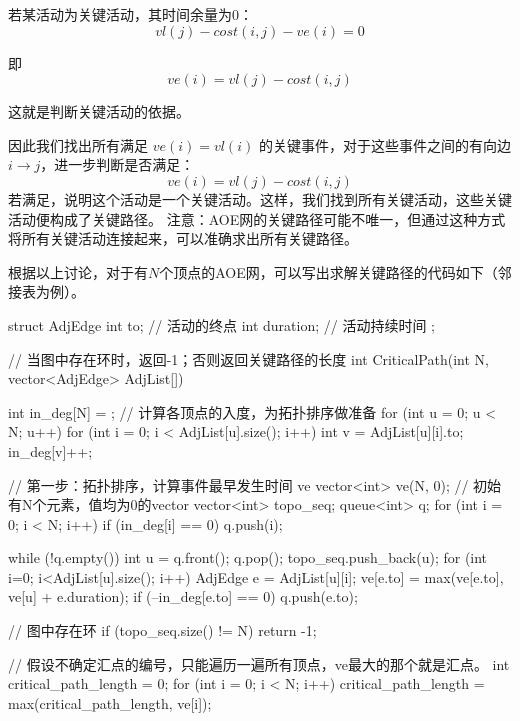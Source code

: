 若某活动为关键活动，其时间余量为0：
\[
vl(j)-cost(i,j)-ve(i)=0
\]

即
\[
    ve(i)=vl(j)-cost(i,j)
\]

这就是判断关键活动的依据。



因此我们找出所有满足 \(ve(i)=vl(i)\) 的关键事件，对于这些事件之间的有向边 \(i\rightarrow j\)，进一步判断是否满足：
\[
ve(i)=vl(j)-cost(i,j)
\]
若满足，说明这个活动是一个关键活动。这样，我们找到所有关键活动，这些关键活动便构成了关键路径。
注意：AOE网的关键路径可能不唯一，但通过这种方式将所有关键活动连接起来，可以准确求出所有关键路径。

根据以上讨论，对于有$N$个顶点的AOE网，可以写出求解关键路径的代码如下（邻接表为例）。
\begin{cppcodeNum}[codetitle={拓扑排序求解关键路径}, label={code:拓扑排序求解关键路径}]
    struct AdjEdge {
        int to;         // 活动的终点
        int duration;   // 活动持续时间
    };

    // 当图中存在环时，返回-1；否则返回关键路径的长度
    int CriticalPath(int N, vector<AdjEdge> AdjList[]) {
        int in_deg[N] = {};
        // 计算各顶点的入度，为拓扑排序做准备
        for (int u = 0; u < N; u++) {
            for (int i = 0; i < AdjList[u].size(); i++) {
                int v = AdjList[u][i].to;
                in_deg[v]++;
            }
        }

        // 第一步：拓扑排序，计算事件最早发生时间 ve
        vector<int> ve(N, 0);   // 初始有N个元素，值均为0的vector
        vector<int> topo_seq;
        queue<int> q;
        for (int i = 0; i < N; i++) {
            if (in_deg[i] == 0) {
                q.push(i);
            }
        }

        while (!q.empty()) {
            int u = q.front();
            q.pop();
            topo_seq.push_back(u);
            for (int i=0; i<AdjList[u].size(); i++) {
                AdjEdge e = AdjList[u][i];
                ve[e.to] = max(ve[e.to], ve[u] + e.duration);
                if (--in_deg[e.to] == 0) {
                    q.push(e.to);
                }
            }
        }

        // 图中存在环
        if (topo_seq.size() != N) {
            return -1;
        }

        // 假设不确定汇点的编号，只能遍历一遍所有顶点，ve最大的那个就是汇点。
        int critical_path_length = 0;
        for (int i = 0; i < N; i++) {
            critical_path_length = max(critical_path_length, ve[i]);
        }

}
\end{cppcodeNum}

